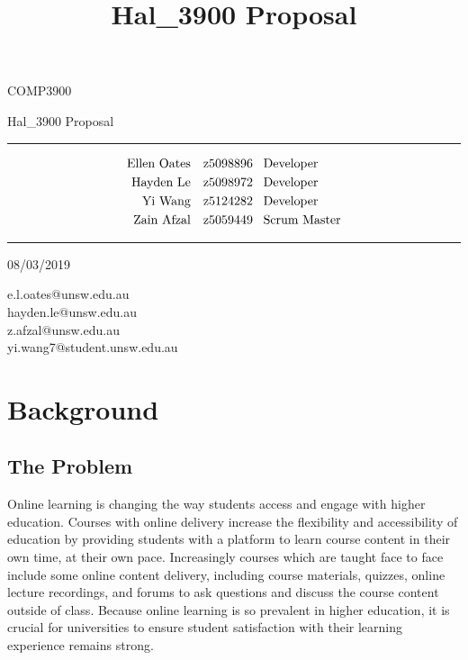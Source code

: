\documentclass{article}
\title{Hal\_3900 Proposal}
\begin{document}
\begin{LARGE}
\begin{center}
\vspace*{15mm}

COMP3900

Hal\_3900 Proposal

\rule[4.5pt]{0.61\textwidth}{0.3pt}

\begin{align*}
  \text{Ellen Oates}  \quad &\text{z5098896 \enspace Developer} \\
  \text{Hayden Le}    \quad &\text{z5098972 \enspace Developer} \\
  \text{Yi Wang}      \quad &\text{z5124282 \enspace Developer} \\
  \text{Zain Afzal}   \quad &\text{z5059449 \enspace Scrum Master}
\end{align*}

\rule[4.5pt]{0.61\textwidth}{0.3pt}

08/03/2019

\end{center}
\end{LARGE}

\vfill
\small{e.l.oates@unsw.edu.au}\\
\small{hayden.le@unsw.edu.au}\\
\small{z.afzal@unsw.edu.au}\\
\small{yi.wang7@student.unsw.edu.au}

\newpage


\tableofcontents 
\newpage
 
\section{Background}

\subsection{The Problem}
Online learning is changing the way students access and engage with higher education. Courses with online delivery increase the flexibility and accessibility of education by providing students with a platform to learn course content in their own time, at their own pace. Increasingly courses which are taught face to face include some online content delivery, including course materials, quizzes, online lecture recordings, and forums to ask questions and discuss the course content outside of class. Because online learning is so prevalent in higher education, it is crucial for universities to ensure student satisfaction with their learning experience remains strong. 
\end{document}
